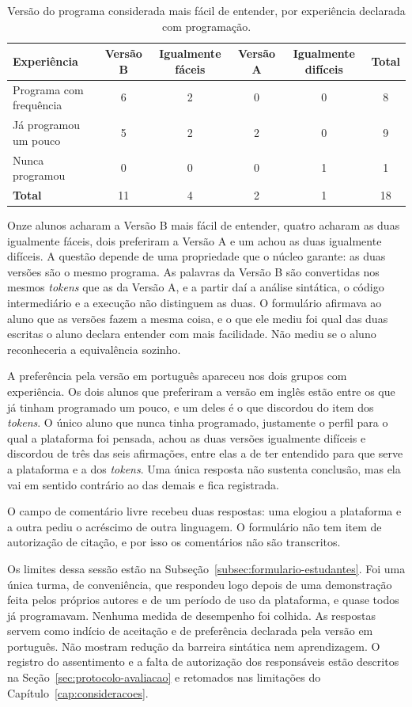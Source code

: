 \begin{table}[htbp]
\centering
\caption{Versão do programa considerada mais fácil de entender, por experiência declarada com programação.}
\label{tab:resultado-versoes}
\footnotesize
\renewcommand{\arraystretch}{1.2}
\begin{tabular}{|p{4.3cm}|c|c|c|c|c|}
\hline
\textbf{Experiência} & \textbf{Versão B} & \textbf{Igualmente fáceis} & \textbf{Versão A} & \textbf{Igualmente difíceis} & \textbf{Total} \\\hline
Programa com frequência & 6 & 2 & 0 & 0 & 8 \\\hline
Já programou um pouco & 5 & 2 & 2 & 0 & 9 \\\hline
Nunca programou & 0 & 0 & 0 & 1 & 1 \\\hline
\textbf{Total} & 11 & 4 & 2 & 1 & 18 \\\hline
\end{tabular}
\end{table}

Onze alunos acharam a Versão B mais fácil de entender, quatro acharam as duas igualmente fáceis, dois preferiram a Versão A e um achou as duas igualmente difíceis. A questão depende de uma propriedade que o núcleo garante: as duas versões são o mesmo programa. As palavras da Versão B são convertidas nos mesmos \textit{tokens} que as da Versão A, e a partir daí a análise sintática, o código intermediário e a execução não distinguem as duas. O formulário afirmava ao aluno que as versões fazem a mesma coisa, e o que ele mediu foi qual das duas escritas o aluno declara entender com mais facilidade. Não mediu se o aluno reconheceria a equivalência sozinho.

A preferência pela versão em português apareceu nos dois grupos com experiência. Os dois alunos que preferiram a versão em inglês estão entre os que já tinham programado um pouco, e um deles é o que discordou do item dos \textit{tokens}. O único aluno que nunca tinha programado, justamente o perfil para o qual a plataforma foi pensada, achou as duas versões igualmente difíceis e discordou de três das seis afirmações, entre elas a de ter entendido para que serve a plataforma e a dos \textit{tokens}. Uma única resposta não sustenta conclusão, mas ela vai em sentido contrário ao das demais e fica registrada.

O campo de comentário livre recebeu duas respostas: uma elogiou a plataforma e a outra pediu o acréscimo de outra linguagem. O formulário não tem item de autorização de citação, e por isso os comentários não são transcritos.

Os limites dessa sessão estão na Subseção~\ref{subsec:formulario-estudantes}. Foi uma única turma, de conveniência, que respondeu logo depois de uma demonstração feita pelos próprios autores e de um período de uso da plataforma, e quase todos já programavam. Nenhuma medida de desempenho foi colhida. As respostas servem como indício de aceitação e de preferência declarada pela versão em português. Não mostram redução da barreira sintática nem aprendizagem. O registro do assentimento e a falta de autorização dos responsáveis estão descritos na Seção~\ref{sec:protocolo-avaliacao} e retomados nas limitações do Capítulo~\ref{cap:consideracoes}.

